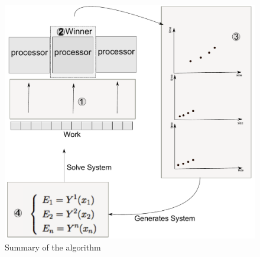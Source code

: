 \documentclass[journal]{IEEEtran}
\begin{document}
\begin{figure}[!t]
	\centering
	\includegraphics[scale=0.33]{diagramaAlgoritmo.pdf} 
	\caption{Summary of the algorithm}
	\label{fig: algoritmo}
\end{figure}




\end{document}
